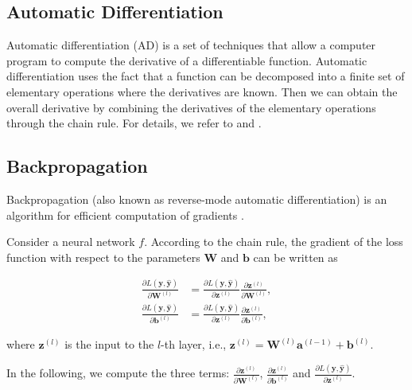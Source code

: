 \documentclass[
	parskip, 			   %
	twoside, 			   %
	DIV=14, 			   %
	BCOR=15.0mm, 		   %
	headsepline, 		   %
	open=right, 		   %
	captions=tableheading, %
	bibliography=totoc,    %
	numbers=noenddot       %
]{scrreprt}
\begin{document}
\subsection{Automatic Differentiation}
Automatic differentiation (AD) is a set of techniques that allow a computer program to compute the derivative of a differentiable function. Automatic differentiation uses the fact that a function can be decomposed into a finite set of elementary operations where the derivatives are known. Then we can obtain the overall derivative by combining the derivatives of the elementary operations through the chain rule. For details, we refer to \cite{baydin2018automatic} and \cite{margossian2019review}.

\subsection{Backpropagation}
Backpropagation (also known as reverse-mode automatic differentiation) is an algorithm for efficient computation of gradients \cite{baydin2018automatic}.

Consider a neural network $f$. According to the chain rule, the gradient of the loss function with respect to the parameters $\mathbf{W}$ and $\mathbf{b}$ can be written as

\begin{equation}
    \label{eq:Chain_rule_partial}
    \begin{aligned}
        \frac{\partial L\left( \mathbf{y}, \hat{\mathbf{y}} \right)}{\partial \mathbf{W}^{(l)}} &= \frac{\partial L \left( \mathbf{y}, \hat{\mathbf{y}} \right)}{\partial \mathbf{z}^{(l)}} 
        \frac{\partial \mathbf{z}^{(l)}}{\partial \mathbf{W}^{(l)}},
        \\
        \frac{\partial L\left( \mathbf{y}, \hat{\mathbf{y}} \right)}{\partial \mathbf{b}^{(l)}} &= \frac{\partial L \left( \mathbf{y}, \hat{\mathbf{y}} \right)}{\partial \mathbf{z}^{(l)}} 
        \frac{\partial \mathbf{z}^{(l)}}{\partial \mathbf{b}^{(l)}},
    \end{aligned}
\end{equation}

where $\mathbf{z}^{(l)}$ is the input to the $l$-th layer, i.e., $\mathbf{z}^{(l)} = \mathbf{W}^{(l)} \mathbf{a}^{(l-1)} + \mathbf{b}^{(l)}$. 

In the following, we compute the three terms: $\frac{\partial \mathbf{z}^{(l)}}{\partial \mathbf{W}^{(l)}}$, $\frac{\partial \mathbf{z}^{(l)}}{\partial \mathbf{b}^{(l)}}$ and $\frac{\partial L \left( \mathbf{y}, \hat{\mathbf{y}} \right)}{\partial \mathbf{z}^{(l)}}$.
\end{document}
